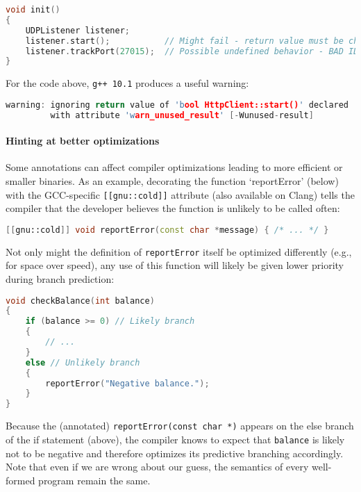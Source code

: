 \documentclass[twoside,10pt,letterpaper,usenames]{newstyle-PearsonGeneric-7-38}
\begin{document}
\begin{lstlisting}[language=C++, caption={missing caption}, label={testlabel}, frame=tb]
void init()
{
    UDPListener listener;
    listener.start();           // Might fail - return value must be checked!
    listener.trackPort(27015);  // Possible undefined behavior - BAD IDEA!
}
\end{lstlisting}
    

For the code above, \texttt{g++ 10.1} produces a useful warning:

\begin{lstlisting}[language=C++, caption={missing caption}, label={testlabel}, frame=tb]
warning: ignoring return value of 'bool HttpClient::start()' declared
         with attribute 'warn_unused_result' [-Wunused-result]
\end{lstlisting}
    

\paragraph[Hinting at better optimizations]{Hinting at better optimizations}\label{hinting-at-better-optimizations}

Some annotations can affect compiler optimizations leading to more
efficient or smaller binaries. As an example, decorating the function
`reportError' (below) with the GCC-specific \texttt{[[gnu::cold]]}
attribute (also available on Clang) tells the compiler that the
developer believes the function is unlikely to be called often:

\begin{lstlisting}[language=C++, caption={missing caption}, label={testlabel}, frame=tb]
[[gnu::cold]] void reportError(const char *message) { /* ... */ }
\end{lstlisting}
    

Not only might the definition of \texttt{reportError} itself be
optimized differently (e.g., for space over speed), any use of this
function will likely be given lower priority during branch prediction:

\begin{lstlisting}[language=C++, caption={missing caption}, label={testlabel}, frame=tb]
void checkBalance(int balance)
{
    if (balance >= 0) // Likely branch
    {
        // ...
    }
    else // Unlikely branch
    {
        reportError("Negative balance.");
    }
}
\end{lstlisting}
    

Because the (annotated) \texttt{reportError(const char *)} appears on
the else branch of the if statement (above), the compiler knows to
expect that \texttt{balance} is likely {not} to be negative and
therefore optimizes its predictive branching accordingly. Note that even
if we are wrong about our guess, the semantics of every well-formed
program remain the same.
\end{document}
